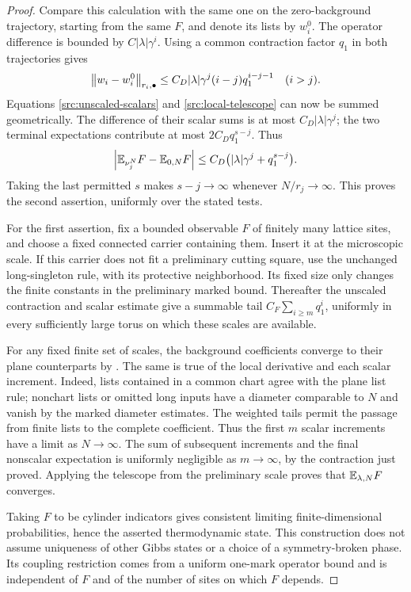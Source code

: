 \begin{proof}
Compare this calculation with the same one on the zero-background
trajectory, starting from the same $F$, and denote its lists by
$w_i^0$. The operator difference is bounded by $C|\lambda|\gamma^i$.
Using a common contraction factor $q_1$ in both trajectories gives
\[
 \left\|w_i-w_i^0\right\|_{r_i,\bullet}
 \leq C_D|\lambda|\gamma^j(i-j)q_1^{i-j-1}
 \quad(i>j).
\]
Equations \eqref{src:unscaled-scalars} and
\eqref{src:local-telescope} can now be summed geometrically. The
difference of their scalar sums is at most $C_D|\lambda|\gamma^j$;
the two terminal expectations contribute at most $2C_Dq_1^{s-j}$.
Thus
\begin{equation}
 \left|{\mathbb E}_{\nu_j^N}F-{\mathbb E}_{0,N}F\right|
 \leq C_D\bigl(|\lambda|\gamma^j+q_1^{s-j}\bigr).
 \label{src:residual-comparison}
\end{equation}
Taking the last permitted $s$ makes $s-j\to\infty$ whenever
$N/r_j\to\infty$. This proves the second assertion, uniformly over
the stated tests.

For the first assertion, fix a bounded observable $F$ of finitely many
lattice sites, and choose a fixed connected carrier containing them.
Insert it at the microscopic scale. If this carrier does not fit a
preliminary cutting square, use the unchanged long-singleton rule,
with its protective neighborhood. Its fixed size only changes the
finite constants in the preliminary marked bound. Thereafter the
unscaled contraction and scalar estimate give a summable tail
$C_F\sum_{i\geq m}q_1^i$, uniformly in every sufficiently large torus
on which these scales are available.

For any fixed finite set of scales, the background coefficients
converge to their plane counterparts by . The same
is true of the local derivative and each scalar increment. Indeed,
lists contained in a common chart agree with the plane list rule;
nonchart lists or omitted long inputs have a diameter comparable to
$N$ and vanish by the marked diameter estimates. The weighted tails
permit the passage from finite lists to the complete coefficient.
Thus the first $m$ scalar increments have a limit as $N\to\infty$.
The sum of subsequent increments and the final nonscalar expectation
is uniformly negligible as $m\to\infty$, by the contraction just
proved. Applying the telescope from the preliminary scale proves that
${\mathbb E}_{\lambda,N}F$ converges.

Taking $F$ to be cylinder indicators gives consistent limiting
finite-dimensional probabilities, hence the asserted thermodynamic
state. This construction does not assume uniqueness of other Gibbs
states or a choice of a symmetry-broken phase. Its coupling restriction
comes from a uniform one-mark operator bound and is independent of
$F$ and of the number of sites on which $F$ depends.
\end{proof}

